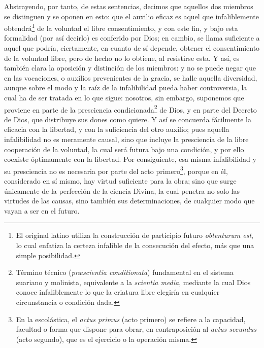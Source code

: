 \documentclass{article}
\begin{document}
Abstrayendo, por tanto, de estas sentencias, decimos que aquellos dos miembros se
distinguen y se oponen en esto: que el auxilio eficaz es aquel que infaliblemente
obtendrá\footnote{El original latino utiliza la construcción de participio futuro
\textit{obtenturum est}, lo cual enfatiza la certeza infalible de la consecución del
efecto, más que una simple posibilidad.} de la voluntad el libre consentimiento, y con
este fin, y bajo esta formalidad (por así decirlo) es conferido por Dios; en cambio, se
llama suficiente a aquel que podría, ciertamente, en cuanto de sí depende, obtener el
consentimiento de la voluntad libre, pero de hecho no lo obtiene, al resistirse esta. Y
así, es también clara la oposición y distinción de los miembros: y no se puede negar que
en las vocaciones, o auxilios prevenientes de la gracia, se halle aquella diversidad,
aunque sobre el modo y la raíz de la infalibilidad pueda haber controversia, la cual ha
de ser tratada en lo que sigue: nosotros, sin embargo, suponemos que proviene en parte
de la presciencia condicionada\footnote{Término técnico (\textit{præscientia
conditionata}) fundamental en el sistema suariano y molinista, equivalente a la
\textit{scientia media}, mediante la cual Dios conoce infaliblemente lo que la criatura
libre elegiría en cualquier circunstancia o condición dada.} de Dios, y en parte del
Decreto de Dios, que distribuye sus dones como quiere. Y así se concuerda fácilmente la
eficacia con la libertad, y con la suficiencia del otro auxilio; pues aquella
infalibilidad no es meramente causal, sino que incluye la presciencia de la libre
cooperación de la voluntad, la cual será futura bajo una condición, y por ello coexiste
óptimamente con la libertad. Por consiguiente, esa misma infalibilidad y su presciencia
no es necesaria por parte del acto primero\footnote{En la escolástica, el \textit{actus
primus} (acto primero) se refiere a la capacidad, facultad o forma que dispone para
obrar, en contraposición al \textit{actus secundus} (acto segundo), que es el ejercicio
o la operación misma.}, porque en él, considerado en sí mismo, hay virtud suficiente
para la obra; sino que surge únicamente de la perfección de la ciencia Divina, la cual
penetra no solo las virtudes de las causas, sino también sus determinaciones, de
cualquier modo que vayan a ser en el futuro.
\end{document}
